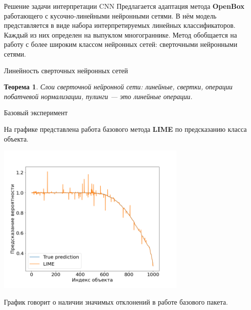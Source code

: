 \documentclass{beamer}
\begin{document}
\begin{frame}{Решение задачи интерпретации CNN}
Предлагается адаптация метода \textbf{OpenBox} работающего с  кусочно-линейными нейронными сетями. В нём модель представляется в виде набора интерпретируемых линейных классификаторов. Каждый из них определен на выпуклом многограннике. Метод обобщается на работу с более широким классом нейронных сетей: сверточными нейронными сетями.
\end{frame}
\begin{frame}{Линейность сверточных нейронных сетей}
\newtheorem{hypothesis}{Теорема}
\begin{hypothesis}
Слои сверточной нейронной сети: линейные, свертки, операции побатчевой нормализации, пулинги --- это линейные операции.
\end{hypothesis}

\end{frame}
\begin{frame}{Базовый эксперимент}

 На графике представлена работа базового метода \textbf{LIME} по предсказанию класса объекта.

 \includegraphics[width=0.70\textwidth]{../fig/True_Lime.png}


График говорит о наличии значимых отклонений в работе базового пакета.

\end{frame}
\end{document}
